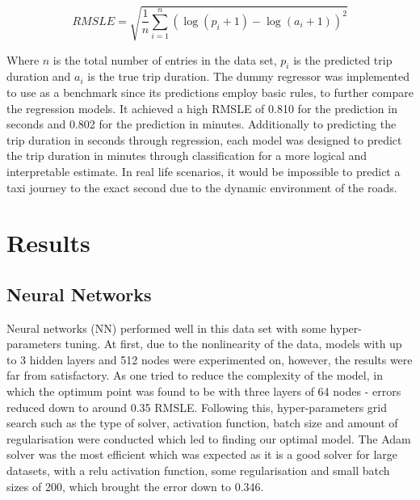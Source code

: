 \documentclass[a4paper]{article}
\begin{document}
\[RMSLE = \sqrt{\frac{1}{n}\sum_{i=1}^n(\log(p_i+1) - \log(a_i+1))^2}\]

Where $n$ is the total number of entries in the data set, $p_i$ is the predicted trip
duration and $a_i$ is the true trip duration.  The dummy regressor was implemented
to use as a benchmark since its predictions employ basic rules, to further
compare the regression models. It achieved a high RMSLE of 0.810 for the
prediction in seconds and 0.802 for the prediction in minutes.  Additionally to
predicting the trip duration in seconds through regression, each model was
designed to predict the trip duration in minutes through classification for a
more logical and interpretable estimate. In real life scenarios, it would be
impossible to predict a taxi journey to the exact second due to the dynamic
environment of the roads.

\section{Results}
\subsection{Neural Networks}
Neural networks (NN) performed well in this data set with some hyper-parameters
tuning. At first, due to the nonlinearity of the data, models with up to 3
hidden layers and 512 nodes were experimented on, however, the results were far
from satisfactory. As one tried to reduce the complexity of the model, in which
the optimum point was found to be with three layers of 64 nodes - errors reduced
down to around 0.35 RMSLE. Following this, hyper-parameters grid search such as
the type of solver, activation function, batch size and amount of regularisation
were conducted which led to finding our optimal model. The Adam solver was the
most efficient which was expected as it is a good solver for large datasets,
with a relu activation function, some regularisation and small batch sizes of
200, which brought the error down to 0.346.
\end{document}
